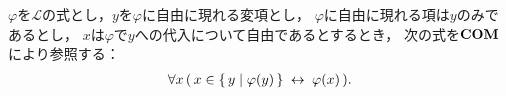 	\begin{comment}
	\begin{screen}
		\begin{thm}[(ボツ!!!)等号の対称律]\label{thm:symmetry_of_equality}
			$a,b$を類とするとき
			\begin{align}
				\EXTAX,\EQAX \vdash a = b \rarrow b = a.
			\end{align}
		\end{thm}
	\end{screen}
	
	\begin{prf}
		定理\ref{thm:axiom_of_extensionality_equivalent}より
		\begin{align}
			a=b,\ \EQAX \vdash \forall x\, (\, x \in a  \lrarrow x \in b\, )
		\end{align}
		となるが，ここで類である任意の$\varepsilon$項$\tau$に対して
		\begin{align}
			a=b,\ \EQAX \vdash \tau \in a \lrarrow \tau \in b
		\end{align}
		となるが，他方で推論法則\ref{logicalthm:symmetry_of_equivalence_arrows}より
		\begin{align}
			a=b,\ \EQAX \vdash (\, \tau \in a \lrarrow \tau \in b\, )
				\rarrow (\, \tau \in b \lrarrow \tau \in a\, )
		\end{align}
		が成り立つので，三段論法より
		\begin{align}
			a=b,\ \EQAX \vdash \tau \in b \lrarrow \tau \in a
		\end{align}
		となる．そして$\tau$の任意性より
		\begin{align}
			a=b,\ \EQAX \vdash \forall x\, (\, x \in b  \lrarrow x \in a\, )
		\end{align}
		が成り立つ．外延性の公理より
		\begin{align}
			a=b,\ \EXTAX,\EQAX \vdash \forall x\, (\, x \in b  \lrarrow x \in a\, )
			\rarrow b = a
		\end{align}
		となるので，三段論法より
		\begin{align}
			a=b,\ \EXTAX,\EQAX \vdash b = a
		\end{align}
		となる．最後に演繹法則より
		\begin{align}
			\EXTAX,\EQAX \vdash a = b \rarrow b = a
		\end{align}
		が得られる．
		\QED
	\end{prf}
	\end{comment}
	
	\begin{screen}
		\begin{axm}[内包性公理] 
			$\varphi$を$\mathcal{L}$の式とし，$y$を$\varphi$に自由に現れる変項とし，
			$\varphi$に自由に現れる項は$y$のみであるとし，
			$x$は$\varphi$で$y$への代入について自由であるとするとき，
			次の式を$\mbox{\bf COM}$により参照する：
			\begin{align}
				\forall x\, (\, x \in \left\{\, y \mid \varphi(y)\, \right\} \hspace{0.25em}\leftrightarrow\hspace{0.25em} \varphi(x)\, ).
			\end{align}
		\end{axm}
	\end{screen}
	
